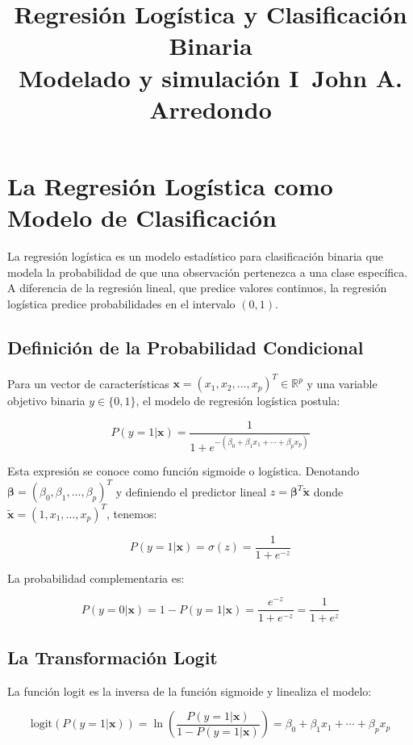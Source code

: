 \documentclass[12pt]{article}
\title{Regresión Logística y Clasificación Binaria\\ 
Modelado y simulación I\
John A. Arredondo}
\date{}
\begin{document}
\maketitle

\section{La Regresión Logística como Modelo de Clasificación}

La regresión logística es un modelo estadístico para clasificación binaria que modela la probabilidad de que una observación pertenezca a una clase específica. A diferencia de la regresión lineal, que predice valores continuos, la regresión logística predice probabilidades en el intervalo $(0,1)$.

\subsection{Definición de la Probabilidad Condicional}

Para un vector de características $\mathbf{x} = (x_1, x_2, \ldots, x_p)^T \in \mathbb{R}^p$ y una variable objetivo binaria $y \in \{0,1\}$, el modelo de regresión logística postula:

\[
P(y=1|\mathbf{x}) = \frac{1}{1 + e^{-(\beta_0 + \beta_1 x_1 + \cdots + \beta_p x_p)}}
\]

Esta expresión se conoce como función sigmoide o logística. Denotando $\boldsymbol{\beta} = (\beta_0, \beta_1, \ldots, \beta_p)^T$ y definiendo el predictor lineal $z = \boldsymbol{\beta}^T \tilde{\mathbf{x}}$ donde $\tilde{\mathbf{x}} = (1, x_1, \ldots, x_p)^T$, tenemos:

\[
P(y=1|\mathbf{x}) = \sigma(z) = \frac{1}{1 + e^{-z}}
\]

La probabilidad complementaria es:

\[
P(y=0|\mathbf{x}) = 1 - P(y=1|\mathbf{x}) = \frac{e^{-z}}{1 + e^{-z}} = \frac{1}{1 + e^{z}}
\]

\subsection{La Transformación Logit}

La función logit es la inversa de la función sigmoide y linealiza el modelo:

\[
\text{logit}\left(P(y=1|\mathbf{x})\right) = \ln\left(\frac{P(y=1|\mathbf{x})}{1 - P(y=1|\mathbf{x})}\right) = \beta_0 + \beta_1 x_1 + \cdots + \beta_p x_p
\]
\end{document}
